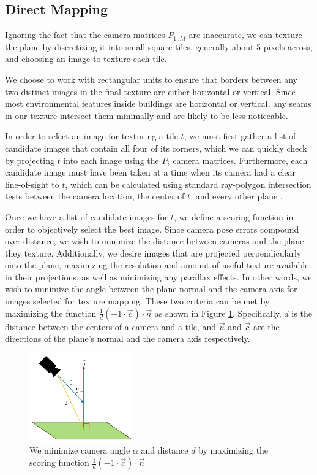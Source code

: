 \documentclass[10pt,twocolumn,letterpaper]{article}
\begin{document}
\subsection{Direct Mapping}
\label{sec:directMapping}

Ignoring the fact that the camera matrices $P_{1..M}$ are inaccurate,
we can texture the plane by discretizing it into small square tiles,
generally about 5 pixels across, and choosing an image to texture each
tile.

We choose to work with rectangular units to ensure that borders
between any two distinct images in the final texture are either
horizontal or vertical. Since most environmental features inside
buildings are horizontal or vertical, any seams in our texture
intersect them minimally and are likely to be less noticeable.

In order to select an image for texturing a tile $t$, we must first
gather a list of candidate images that contain all four of its
corners, which we can quickly check by projecting $t$ into each image
using the $P_i$ camera matrices. Furthermore, each candidate image
must have been taken at a time when its camera had a clear
line-of-sight to $t$, which can be calculated using standard
ray-polygon intersection tests between the camera location, the center
of $t$, and every other plane \cite{rayintersection}.

Once we have a list of candidate images for $t$, we define a scoring
function in order to objectively select the best image. Since camera
pose errors compound over distance, we wish to minimize the distance
between cameras and the plane they texture. Additionally, we desire
images that are projected perpendicularly onto the plane, maximizing
the resolution and amount of useful texture available in their
projections, as well as minimizing any parallax effects. In other
words, we wish to minimize the angle between the plane normal and the
camera axis for images selected for texture mapping. These two
criteria can be met by maximizing the function $\frac{1}{d} (-1 \cdot
\vec{c}) \cdot \vec{n}$ as shown in Figure
\ref{fig:scoringFunction}. Specifically, $d$ is the distance between
the centers of a camera and a tile, and $\vec{n}$ and $\vec{c}$ are
the directions of the plane's normal and the camera axis respectively.

\begin{figure}
  \centering
  \includegraphics[height=1.5in]{scoringFunction.jpg}
  \caption{We minimize camera angle $\alpha$ and distance $d$ by
    maximizing the scoring function $\frac{1}{d} (-1 \cdot \vec{c})
    \cdot \vec{n}$}
  \label{fig:scoringFunction}
\end{figure}
\end{document}
